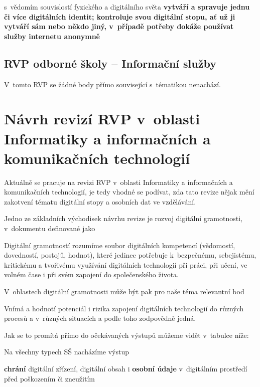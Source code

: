 \begin{displayquote}
s~vědomím souvislostí fyzického a digitálního světa \textbf{vytváří a spravuje jednu či více digitálních identit; kontroluje svou digitální stopu, ať už ji vytváří sám nebo někdo jiný, v~případě potřeby dokáže používat služby internetu anonymně}
\end{displayquote}

\subsection{RVP odborné školy -- Informační služby}

V~tomto RVP se žádné body přímo související s~tématikou nenachází.

\section{Návrh revizí RVP v~oblasti Informatiky a informačních a komunikačních technologií}

Aktuálně se pracuje na revizi RVP v~oblasti Informatiky a informačních a komunikačních technologií, je tedy vhodné se podívat, zda tato revize nějak mění zakotvení tématu digitální stopy a osobních dat ve vzdělávání.

Jedno ze základních východisek návrhu revize je rozvoj digitální gramotnosti, v~dokumentu definované jako 

\begin{displayquote}
Digitální gramotností rozumíme soubor digitálních kompetencí (vědomostí, dovedností, postojů, hodnot), které jedinec potřebuje k bezpečnému, sebejistému, kritickému a tvořivému využívání digitálních technologií při práci, při učení, ve volném čase i při svém zapojení do společenského života.
\end{displayquote}

V~oblastech digitální gramotnosti může být pak pro naše téma relevantní bod

\begin{displayquote}
Vnímá a hodnotí potenciál i rizika zapojení digitálních technologií do různých procesů a v různých situacích a podle toho zodpovědně jedná.
\end{displayquote}

Jak se to promítá přímo do očekávaných výstupů můžeme vidět v~tabulce níže:


Na všechny typech SŠ nacházíme výstup

\begin{displayquote}
\textbf{chrání} digitální zřízení, digitální obsah i \textbf{osobní údaje} v~digitálním prostředí před poškozením či zneužitím
\end{displayquote}


